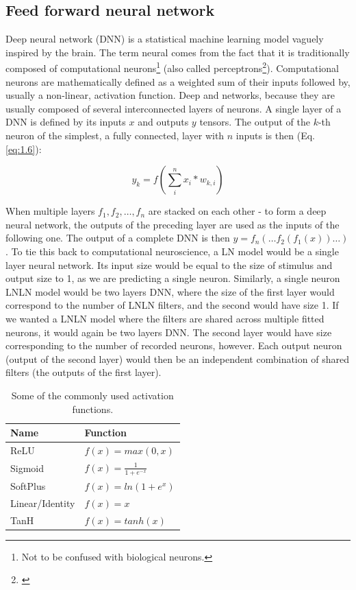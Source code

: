 \subsection{Feed forward neural network}
Deep neural network (DNN) is a statistical machine learning model vaguely inspired by the brain. The term neural comes from the fact that it is traditionally composed of computational neurons\footnote{Not to be confused with biological neurons.} (also called perceptrons\footnote{\citep{Rosenblatt1958ThePA}}). Computational neurons are mathematically defined as a weighted sum of their inputs followed by, usually a non-linear, activation function. Deep and networks, because they are usually composed of several interconnected layers of neurons. A single layer of a DNN is defined by its inputs $x$ and outputs $y$ tensors. The output of the $k$-th neuron of the simplest, a fully connected, layer with $n$ inputs is then (Eq. \ref{eq:1.6}):

\begin{equation}\label{eq:1.6}
    y_k = f(\sum_{i}^{n} x_{i} * w_{k,i})
\end{equation}

When multiple layers $f_1, f_2, \dots, f_n$ are stacked on each other - to form a deep neural network, the outputs of the preceding layer are used as the inputs of the following one. The output of a complete DNN is then $y = f_n(\dots f_2(f_1(x))\dots)$. To tie this back to computational neuroscience, a LN model would be a single layer neural network. Its input size would be equal to the size of stimulus and output size to 1, as we are predicting a single neuron. Similarly, a single neuron LNLN model would be two layers DNN, where the size of the first layer would correspond to the number of LNLN filters, and the second would have size 1. If we wanted a LNLN model where the filters are shared across multiple fitted neurons, it would again be two layers DNN. The second layer would have size corresponding to the number of recorded neurons, however. Each output neuron (output of the second layer) would then be an independent combination of shared filters (the outputs of the first layer).

\begin{table}[h]
    \renewcommand{\arraystretch}{1.2}
    \centering
    \begin{tabular}{l|l}
        \toprule
        \textbf{Name} & \textbf{Function} \\ \midrule
        ReLU & $f(x) = max(0, x)$ \\ 
        Sigmoid & $f(x) = \frac{1 }{1 + e^{-x} } $ \\ 
        SoftPlus & $f(x) = ln(1+e^x)$ \\ 
        Linear/Identity & $f(x) = x$ \\ 
        TanH & $f(x) = tanh(x)$ \\ \bottomrule

    \end{tabular}
    \caption[Commonly used activation functions]{Some of the commonly used activation functions\protect\footnotemark.}
    \label{tab:1.1}
    \renewcommand{\arraystretch}{1.0}
\end{table}

